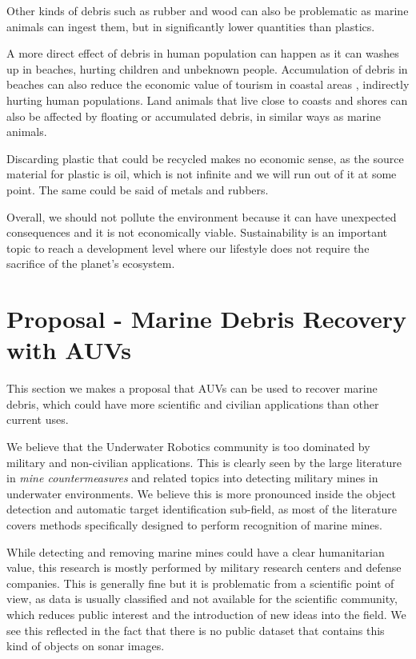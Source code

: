 Other kinds of debris such as rubber and wood can also be problematic as marine animals can ingest them, but in significantly lower quantities than plastics.

A more direct effect of debris in human population can happen as it can washes up in beaches, hurting children and unbeknown people. Accumulation of debris in beaches can also reduce the economic value of tourism in coastal areas \cite{engler2012complex}, indirectly hurting human populations. Land animals that live close to coasts and shores can also be affected by floating or accumulated debris, in similar ways as marine animals.

Discarding plastic that could be recycled makes no economic sense, as the source material for plastic is oil, which is not infinite and we will run out of it at some point. The same could be said of metals and rubbers.

Overall, we should not pollute the environment because it can have unexpected consequences and it is not economically viable. Sustainability is an important topic to reach a development level where our lifestyle does not require the sacrifice of the planet's ecosystem. 

\section{Proposal - Marine Debris Recovery with AUVs}

This section we makes a proposal that AUVs can be used to recover marine debris, which could have more scientific and civilian applications than other current uses.

We believe that the Underwater Robotics community is too dominated by military and non-civilian applications. This is clearly seen by the large literature in \textit{mine countermeasures} and related topics into detecting military mines in underwater environments. We believe this is more pronounced inside the object detection and automatic target identification sub-field, as most of the literature covers methods specifically designed to perform recognition of marine mines.

While detecting and removing marine mines could have a clear humanitarian value, this research is mostly performed by military research centers and defense companies. This is generally fine but it is problematic from a scientific point of view, as data is usually classified and not available for the scientific community, which reduces public interest and the introduction of new ideas into the field. We see this reflected in the fact that there is no public dataset that contains this kind of objects on sonar images.

